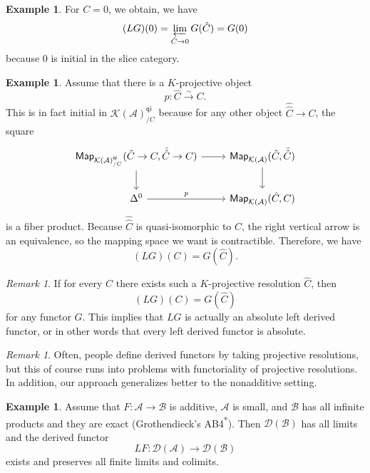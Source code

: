 \documentclass[10pt, oneside]{memoir}
\theoremstyle{definition}
\newtheorem{exm}[thm]{Example}
\theoremstyle{remark}
\newtheorem{rmk}[thm]{Remark}
\theoremstyle{plain}
\theoremstyle{definition}
\theoremstyle{remark}
\newcommand{\mc}[1]{\mathcal{#1}}
\newcommand{\ms}[1]{\mathsf{#1}}
\newcommand{\1}{\mathbf{1}}
\newcommand{\2}{\mathbf{2}}
\newcommand{\3}{\mathbf{3}}
\begin{document}
\begin{exm}
    For \(C = 0 \), we obtain, we have
    \[ (LG)(0) = \varprojlim_{\hat{C} \to 0} G(\hat{C}) = G(0) \]
    because \(0 \) is initial in the slice category.
\end{exm}

\begin{exm}
    Assume that there is a \(K \)-projective object 
    \[ p \colon \hat{C} \xrightarrow{\sim} C. \]
    This is in fact initial in \(\mc{K}(\mc{A})_{/C}^{\ms{qi}} \) because for any other object \(\hat{\hat{C}} \to C \), the square
    \begin{equation*}
    \begin{tikzcd}
        \ms{Map}_{\mc{K}(\mc{A})_{/C}^{\ms{qi}}}(\hat{C} \to C, \hat{\hat{C}} \to C) \ar{r} \ar{d} & \ms{Map}_{\mc{K}(\mc{A})} (\hat{C}, \hat{\hat{C}}) \ar{d} \\
        \Delta^0 \ar{r}{p} & \ms{Map}_{\mc{K}(\mc{A})}(\hat{C}, C)
    \end{tikzcd}
    \end{equation*}
    is a fiber product. Because \(\hat{\hat{C}} \) is quasi-isomorphic to \(C \), the right vertical arrow is an equivalence, so the mapping space we want is contractible. Therefore, we have
    \[ (LG)(C) = G(\hat{C}). \]
\end{exm}

\begin{rmk}
    If for every \(C \) there exists such a \(K \)-projective resolution \(\hat{C} \), then
    \[ (LG)(C) = G(\hat{C}) \]
    for any functor \(G \). This implies that \(LG \) is actually an absolute left derived functor, or in other words that every left derived functor is absolute.
\end{rmk}

\begin{rmk}
    Often, people define derived functors by taking projective resolutions, but this of course runs into problems with functoriality of projective resolutions. In addition, our approach generalizes better to the nonadditive setting.
\end{rmk}

\begin{exm}
    Assume that \(F \colon \mc{A} \to \mc{B} \) is additive, \(\mc{A} \) is small, and \(\mc{B} \) has all infinite products and they are exact (Grothendieck's AB4\textsuperscript{*}). Then \(\mc{D}(\mc{B}) \) has all limits and the derived functor
    \[ LF \colon \mc{D}(\mc{A}) \to \mc{D}(\mc{B}) \]
    exists and preserves all finite limits and colimits.
\end{exm}
\end{document}
